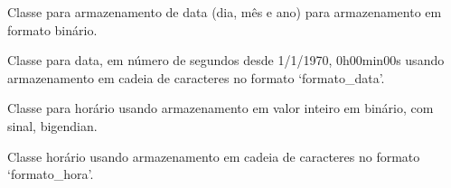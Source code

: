 \documentclass[letterpaper,10pt,brazil]{sphinxmanual}
\begin{document}
\begin{fulllineitems}
\label{\detokenize{index:estrutarq.campo.campo_tempo.CampoDataBinario}}
\pysigstartsignatures
{}
\pysigstopsignatures
\sphinxAtStartPar
Classe para armazenamento de data (dia, mês e ano) para armazenamento
em formato binário.

\end{fulllineitems}


\begin{fulllineitems}
\label{\detokenize{index:estrutarq.campo.campo_tempo.CampoDataFixo}}
\pysigstartsignatures
{}
\pysigstopsignatures
\sphinxAtStartPar
Classe para data, em número de segundos desde 1/1/1970,
0h00min00s usando armazenamento em cadeia de caracteres no formato
‘formato\_data’.

\end{fulllineitems}


\begin{fulllineitems}
\label{\detokenize{index:estrutarq.campo.campo_tempo.CampoHoraBinario}}
\pysigstartsignatures
{}
\pysigstopsignatures
\sphinxAtStartPar
Classe para horário usando armazenamento em valor inteiro em binário,
com sinal, big\sphinxhyphen{}endian.

\end{fulllineitems}


\begin{fulllineitems}
\label{\detokenize{index:estrutarq.campo.campo_tempo.CampoHoraFixo}}
\pysigstartsignatures
{}
\pysigstopsignatures
\sphinxAtStartPar
Classe horário usando armazenamento em cadeia de caracteres no formato
‘formato\_hora’.

\end{fulllineitems}
\end{document}
